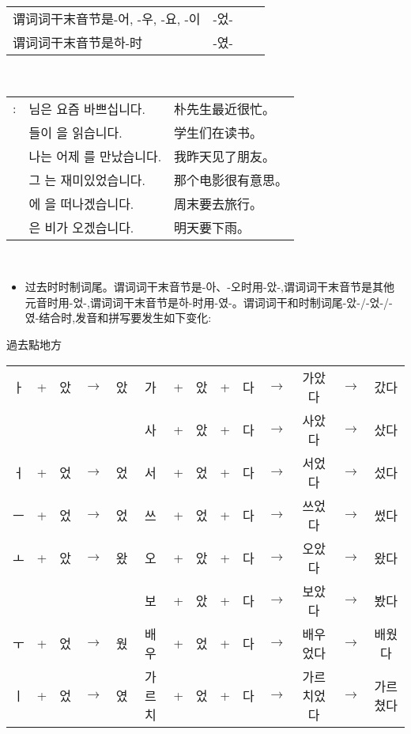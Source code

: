\begin{grammar}
\begin{grammarsect}[时制]
\begin{tabular}{|l|c|c|c|}
			谓词词干末音节是\kr -어, -우, -요, -이                 &\kr  -었- &                       &                      \\\cline{1-2}
			谓词词干末音节是{\kr 하-}时                            &\kr  -였- &                       &                      \\\hline
		\end{tabular}\\
		\begin{tabular}{lll}
			\kr \ruby{例}{예}: & \kr \ruby{朴}{박} \ruby{先生}{선생}님은 요즘 바쁘십니다. & 朴先生最近很忙。  \\
			             & \kr \ruby{學生}{학생}들이 \ruby{冊}{책}을 읽습니다.   & 学生们在读书。   \\
			             & \kr 나는 어제 \ruby{親舊}{친구}를 만났습니다.           & 我昨天见了朋友。  \\
			             & \kr 그 \ruby{映畫}{영화}는 재미있었습니다.             & 那个电影很有意思。 \\
			             & \kr \ruby{週末}{주말}에 \ruby{旅行}{여행}을 떠나겠습니다. & 周末要去旅行。   \\
			             & \kr \ruby{來日}{내일}은 비가 오겠습니다.              & 明天要下雨。
		\end{tabular}\\
	\end{grammarsect}
	\begin{grammarsect}[\kr -았-/-었-/-였-]
		\begin{itemize}
			\item 过去时时制词尾。谓词词干末音节是{\kr -아、-오}时用{\kr -았-},谓词词干末音节是其他元音时用{\kr -었-},谓词词干末音节是{\kr 하-}时用{\kr -였-}。谓词词干和时制词尾{\kr -았-/-었-/-였-}结合时,发音和拼写要发生如下变化:
		\end{itemize}
		{\color{white} 過去點地方}
		{\kr \begin{tabular}{|ccccc|ccccccccc|}
			\hline
			ㅏ & + & 았 & $\to$ & 았 & 가   & + & 았 & + & 다 & $\to$ & 가았다   & $\to$ & 갔다   \\
			  &   &   &       &   & 사   & + & 았 & + & 다 & $\to$ & 사았다   & $\to$ & 샀다   \\
			ㅓ & + & 었 & $\to$ & 었 & 서   & + & 었 & + & 다 & $\to$ & 서었다   & $\to$ & 섰다   \\
			ㅡ & + & 었 & $\to$ & 었 & 쓰   & + & 었 & + & 다 & $\to$ & 쓰었다   & $\to$ & 썼다   \\\hline
			ㅗ & + & 았 & $\to$ & 왔 & 오   & + & 았 & + & 다 & $\to$ & 오았다   & $\to$ & 왔다   \\
			  &   &   &       &   & 보   & + & 았 & + & 다 & $\to$ & 보았다   & $\to$ & 봤다   \\
			ㅜ & + & 었 & $\to$ & 웠 & 배우  & + & 었 & + & 다 & $\to$ & 배우었다  & $\to$ & 배웠다  \\
			ㅣ & + & 었 & $\to$ & 였 & 가르치 & + & 었 & + & 다 & $\to$ & 가르치었다 & $\to$ & 가르쳤다 \\\hline
		\end{tabular}}\\


\end{grammarsect}
\end{grammar}
